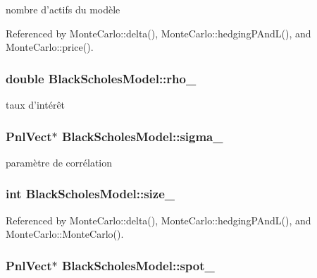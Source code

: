 nombre d'actifs du modèle 



Referenced by Monte\-Carlo\-::delta(), Monte\-Carlo\-::hedging\-P\-And\-L(), and Monte\-Carlo\-::price().

\hypertarget{classBlackScholesModel_a1022a65929e3656f8990b7b0a63705ba}{
\subsubsection[{rho\-\_\-}]{\setlength{\rightskip}{0pt plus 5cm}double Black\-Scholes\-Model\-::rho\-\_\-}}\label{classBlackScholesModel_a1022a65929e3656f8990b7b0a63705ba}


taux d'intérêt 

\hypertarget{classBlackScholesModel_a745a2d85da5056b44bd88f37ee7b33e0}{
\subsubsection[{sigma\-\_\-}]{\setlength{\rightskip}{0pt plus 5cm}Pnl\-Vect$\ast$ Black\-Scholes\-Model\-::sigma\-\_\-}}\label{classBlackScholesModel_a745a2d85da5056b44bd88f37ee7b33e0}


paramètre de corrélation 

\hypertarget{classBlackScholesModel_ab84e9318c0c1e8a50d5e2f9a70f1256e}{
\subsubsection[{size\-\_\-}]{\setlength{\rightskip}{0pt plus 5cm}int Black\-Scholes\-Model\-::size\-\_\-}}\label{classBlackScholesModel_ab84e9318c0c1e8a50d5e2f9a70f1256e}


Referenced by Monte\-Carlo\-::delta(), Monte\-Carlo\-::hedging\-P\-And\-L(), and Monte\-Carlo\-::\-Monte\-Carlo().

\hypertarget{classBlackScholesModel_a6ce6853d5f0d65c8e0f07cdedca3e26a}{
\subsubsection[{spot\-\_\-}]{\setlength{\rightskip}{0pt plus 5cm}Pnl\-Vect$\ast$ Black\-Scholes\-Model\-::spot\-\_\-}}\label{classBlackScholesModel_a6ce6853d5f0d65c8e0f07cdedca3e26a}


